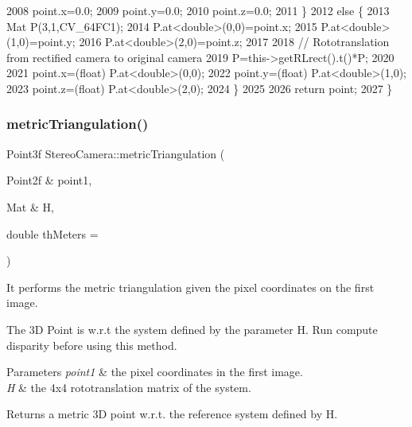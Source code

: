 \begin{DoxyCode}
2008         point.x=0.0;
2009         point.y=0.0;
2010         point.z=0.0;
2011     \}
2012     \textcolor{keywordflow}{else} \{
2013         Mat P(3,1,CV\_64FC1);
2014         P.at<\textcolor{keywordtype}{double}>(0,0)=point.x;
2015         P.at<\textcolor{keywordtype}{double}>(1,0)=point.y;
2016         P.at<\textcolor{keywordtype}{double}>(2,0)=point.z;
2017 
2018         \textcolor{comment}{// Rototranslation from rectified camera to original camera}
2019         P=this->getRLrect().t()*P;
2020 
2021         point.x=(float) P.at<\textcolor{keywordtype}{double}>(0,0);
2022         point.y=(float) P.at<\textcolor{keywordtype}{double}>(1,0);
2023         point.z=(float) P.at<\textcolor{keywordtype}{double}>(2,0);
2024     \}
2025 
2026     \textcolor{keywordflow}{return} point;
2027 \}
\end{DoxyCode}
\mbox{\label{classStereoCamera_a3cf53fac6336eea107a26bd5cdbbdd03}} 
\subsubsection{\texorpdfstring{metric\+Triangulation()}{metricTriangulation()}\hspace{0.1cm}{\footnotesize\ttfamily [2/2]}}
{\footnotesize\ttfamily Point3f Stereo\+Camera\+::metric\+Triangulation (\begin{DoxyParamCaption}\item[{Point2f \&}]{point1,  }\item[{Mat \&}]{H,  }\item[{double}]{th\+Meters = {} }\end{DoxyParamCaption})}



It performs the metric triangulation given the pixel coordinates on the first image. 

The 3D Point is w.\+r.\+t the system defined by the parameter H. Run compute disparity before using this method. 
\begin{DoxyParams}{Parameters}
{\em point1} & the pixel coordinates in the first image. \\
\hline
{\em H} & the 4x4 rototranslation matrix of the system. \\
\hline
\end{DoxyParams}
\begin{DoxyReturn}{Returns}
a metric 3D point w.\+r.\+t. the reference system defined by H. 
\end{DoxyReturn}


